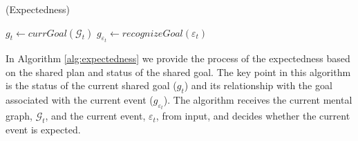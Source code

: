 \documentclass{aamas2016}
\begin{document}
\begin{algorithm}
	\caption{(Expectedness)}
	\label{alg:expectedness}
	\begin{algorithmic}[1]
			\Statex
			\State $\mathit{g}_{t} \gets \textit{currGoal}{(\mathcal{G}_{t})}$
			\State $\mathit{g}_{\varepsilon_t} \gets \textit{recognizeGoal}{(\varepsilon_t)}$
			\Statex
				\State {}
			\EndIf
			\Statex
				\State {}
			\Else
					\State {}
				\Else
							\State {}
						\Else
							\State {}
						\EndIf
					\Else
							\State {}
						\Else
								\State {}
							\Else
								\State {}
							\EndIf
						\EndIf
					\EndIf
				\EndIf
			\EndIf
		\EndFunction
	\end{algorithmic}
\end{algorithm}

In Algorithm \ref{alg:expectedness} we provide the process of the expectedness
based on the shared plan and status of the shared goal. The key point in this
algorithm is the status of the current shared goal ($\mathit{g}_{t}$) and its
relationship with the goal associated with the current event 
($\mathit{g}_{\varepsilon_t}$).  The algorithm receives the current mental
graph, $\mathcal{G}_{t}$, and the current event, $\varepsilon_t$, from input,
and decides whether the current event is expected. 
\end{document}
